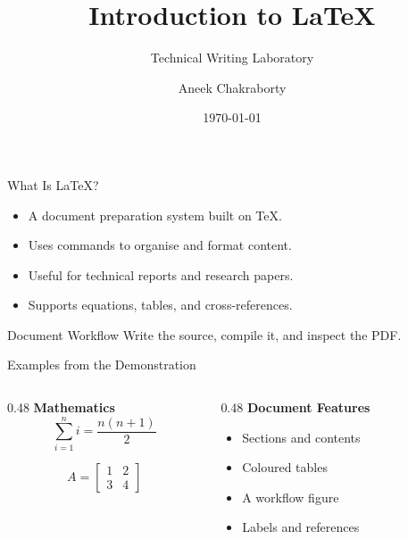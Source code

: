 \documentclass[aspectratio=169]{beamer}
\title{Introduction to LaTeX}
\subtitle{Technical Writing Laboratory}
\author{Aneek Chakraborty}
\institute{MNIT Jaipur}
\date{\today}
\begin{document}
\begin{frame}
    \titlepage
\end{frame}

\begin{frame}{What Is LaTeX?}
    \begin{itemize}
        \item A document preparation system built on TeX.
        \item Uses commands to organise and format content.
        \item Useful for technical reports and research papers.
        \item Supports equations, tables, and cross-references.
    \end{itemize}

    \begin{block}{Document Workflow}
        Write the source, compile it, and inspect the PDF.
    \end{block}
\end{frame}

\begin{frame}{Examples from the Demonstration}
    \begin{columns}[T]
        \begin{column}{0.48\textwidth}
            \textbf{Mathematics}
            \[
                \sum_{i=1}^{n} i = \frac{n(n+1)}{2}
            \]

            \[
                A =
                \begin{bmatrix}
                    1 & 2 \\
                    3 & 4
                \end{bmatrix}
            \]
        \end{column}

        \begin{column}{0.48\textwidth}
            \textbf{Document Features}
            \begin{itemize}
                \item Sections and contents
                \item Coloured tables
                \item A workflow figure
                \item Labels and references
            \end{itemize}
        \end{column}
    \end{columns}
\end{frame}
\end{document}
